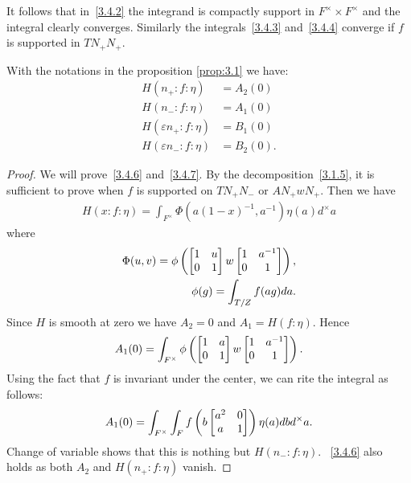 It follows that in~\eqref{3.4.2} the integrand is compactly support in $F^\times \times F^\times$ and the integral clearly converges.
Similarly the integrals~\eqref{3.4.3} and~\eqref{3.4.4} converge if $f$ is supported in $TN_{+}N_{+}$.
\begin{proposition}\label{prop:3.2}
With the notations in the proposition \ref{prop:3.1} we have:
\begin{align}
    H(n_+:f:\eta) &= A_2(0) \label{3.4.6} \\
    H(n_-:f:\eta) &= A_1(0) \label{3.4.7} \\
    H(\varepsilon n_+:f:\eta) &= B_1(0)\label{3.4.8} \\
    H(\varepsilon n_-:f:\eta) &= B_2(0). \label{3.4.9}
\end{align}
\end{proposition}
\begin{proof}
We will prove~\eqref{3.4.6} and~\eqref{3.4.7}.
By the decomposition~\eqref{3.1.5}, it is sufficient to prove when $f$ is supported on $TN_+ N_-$ or $AN_{+}wN_{+}$.
Then we have
\begin{align}
    H(x:f:\eta) = \int_{F^\times} \Phi(a(1-x)^{-1}, a^{-1}) \eta(a) d^\times a
\end{align}
where
\begin{align}
    \Phi(u, v) = \phi\left(\begin{bmatrix} 1 & u \\ 0 & 1 \end{bmatrix} w \begin{bmatrix} 1 & a^{-1} \\ 0 & 1 \end{bmatrix}\right), \\
    \phi(g) = \int_{T/Z} f(ag) da.
\end{align}
Since $H$ is smooth at zero we have $A_2 = 0$ and $A_1 = H(f:\eta)$.
Hence
\[
A_1(0) = \int_{F^\times} \phi\left(\begin{bmatrix} 1 & a \\ 0 & 1 \end{bmatrix} w \begin{bmatrix} 1 & a^{-1} \\ 0 & 1 \end{bmatrix}\right).
\]
Using the fact that $f$ is invariant under the center, we can rite the integral as follows:
\[
A_1(0) = \int_{F^\times} \int_{F} f\left(b \begin{bmatrix} a^2 & 0 \\ a & 1 \end{bmatrix}\right) \eta(a) db d^\times a.
\]
Change of variable shows that this is nothing but $H(n_-:f:\eta)$.
~\eqref{3.4.6} also holds as both $A_2$ and $H(n_+:f:\eta)$ vanish.


\end{proof}
